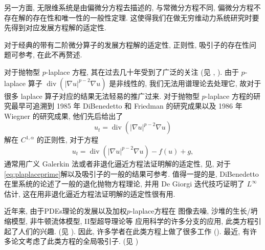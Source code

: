 \documentclass[twoside,longtitle]{LZUthesis}
\theoremstyle{definition}
\numberwithin{equation}{chapter}
\newcommand*\abs[1]{\lvert#1\rvert}
\DeclareMathOperator{\Div}{div}
\begin{document}
另一方面, 无限维系统是由偏微分方程去描述的, 与常微分方程不同, 偏微分方程不存在解的存在性和唯一性的一般性定理.
这使得我们在做无穷维动力系统研究时要先得到对应发展方程解的适定性.

对于经典的带有二阶微分算子的发展方程解的适定性, 正则性, 吸引子的存在性问题可参考\citep{taylorPartialDifferentialEquations2011,temamInfiniteDimensionalDynamicalSystems1997},
在此不再赘述.

对于抛物型 $p$-laplace 方程, 其在过去几十年受到了广泛的关注
(见 \citep{liuAsymptoticRegularityPLaplacian2010,zhongZ2IndexGlobal2010,acerbiRegularityResultsStationary2002,rajagopalMathematicalModelingElectrorheological2001,aboulaichNewDiffusionModels2008,guoSingularPhenomenaSolutions2015,antontsevUniquenessComparisonTheorems2013,gaoExistenceUniquenessNonexistence2016,liuNonlinearDiffusionProblem2019,guoStudyWeakSolutions2011,antontsevParabolicEquationsAnisotropic2007,constantinGlobalExistenceFully2006,constantinGlobalSolutionsQuasilinear2002},
). 由于 $p$-laplace 算子 $\Div(\abs{\nabla u}^{p-2}\nabla u)$ 是非线性的, 我们无法用谱理论去处理它, 故对于很多 laplace 算子对应的结果无法轻易的推广过来.
对于抛物型 $p$-laplace 方程的研究最早可追溯到 1985 年 DiBenedetto 和 Friedman 的研究成果以及 1986 年 Wiegner 的研究成果,
他们先后给出了
\begin{equation*}
	u_t = \Div(\abs{\nabla u}^{p - 2}\nabla u)
\end{equation*}
解在 $C^{1, \alpha}$ 的正则性, 对于方程
\begin{equation}\label{eq:plaplaceprime}
	u_t = \Div(\abs{\nabla u}^{p - 2}\nabla u) - f(u) + g,
\end{equation}
通常用广义 Galerkin 法或者非退化逼近方程法证明解的适定性, 见\citep{babinAttractorsEvolutionEquations1992a},
对于\cref{eq:plaplaceprime}解以及吸引子的一般的结果可参考\citep{efendievAttractorsDegenerateParabolic2013b}.
值得一提的是, DiBenedetto 在\citep{dibenedettoDegenerateParabolicEquations1993a}里系统的论述了一般的退化抛物方程理论,
并用 De Giorgi 迭代技巧证明了 $L^\infty$ 估计, 这在用非退化逼近方程法证明解的适定性很有用.

近年来, 由于PDEs理论的发展以及加权$p$-laplace方程在
图像去噪, 沙堆的生长/坍缩模型, 非牛顿流体模型, II型超导理论等
应用科学的许多分支的应用, 此类方程引起了人们的兴趣.
(见 \citep{aronssonFastSlowDiffusion1996,aubertMathematicalProblemsImage2006,mastorakisSolutionPLaplacianNonNewtonian2009,yinLaplacianTypeEvolution2001}).
因此, 许多学者在此类方程上做了很多工作
(\citep{cortazarExistenceSignChanging2014,musinaExistenceMultiplicityResults2009,gazziniSobolevtypeInequalityRelated2009,liLongtimeBehaviorClass2014b,maGlobalAttractorsWeighted2012a,cavalheiroWeightedSobolevSpaces2008,caldiroliVariationalDegenerateElliptic2000,leBoundaryValueProblems1998,monticelliMaximumPrinciplesWeak2009,dibenedettoDegenerateSingularParabolic1993,galClassDegenerateParabolic2012,yinEvolutionaryWeightedPLaplacian2007,Zhan2019Uniquenessa}).
最近, 有许多论文考虑了此类方程的全局吸引子.
(见 \citep{anhGlobalExistenceLongtime2008,anhGlobalAttractorMsemiflow2010,anhLongtimeBehaviorQuasilinear2009,karachaliosConvergenceAttractorsDegenerate2005,karachaliosDynamicsDegenerateParabolic2006,karachaliosGlobalAttractorsConvergence2005})
\end{document}
